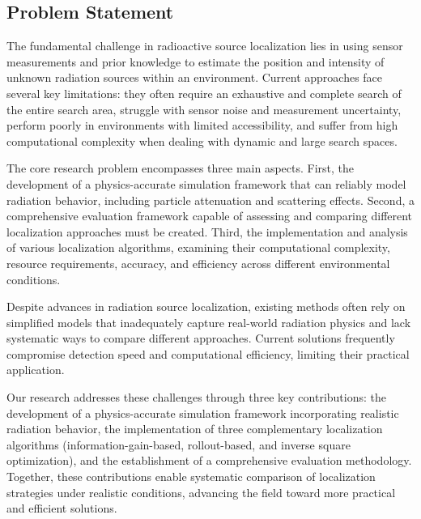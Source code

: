 \documentclass[../report.tex]{subfiles}
\begin{document}
    \subsection{Problem Statement}
    \label{sec:introduction:problem_statement}

    The fundamental challenge in radioactive source localization lies in using sensor measurements and prior knowledge to estimate the position and intensity of unknown radiation 
    sources within an environment. Current approaches face several key limitations: they often require an exhaustive and complete search of the entire search area, struggle with sensor noise and measurement 
    uncertainty, perform poorly in environments with limited accessibility, and suffer from high computational complexity when dealing with dynamic and large search spaces.
   
    The core research problem encompasses three main aspects. First, the development of a physics-accurate simulation framework that can reliably model radiation behavior, including particle 
    attenuation and scattering effects. Second, a comprehensive evaluation framework capable of assessing and comparing different localization approaches must be created. Third, the 
    implementation and analysis of various localization algorithms, examining their computational complexity, resource requirements, accuracy, and efficiency across different environmental conditions.
    \label{sec:introduction:proposed_approach}

    Despite advances in radiation source localization, existing methods often rely on simplified models that inadequately capture real-world radiation physics and 
    lack systematic ways to compare different approaches. Current solutions frequently compromise detection speed and computational efficiency, limiting their 
    practical application.
    
    
    Our research addresses these challenges through three key contributions: the development of a physics-accurate simulation framework incorporating realistic 
    radiation behavior, the implementation of three complementary localization algorithms (information-gain-based, rollout-based, and inverse square optimization), 
    and the establishment of a comprehensive evaluation methodology. Together, these contributions enable systematic comparison of localization strategies under 
    realistic conditions, advancing the field toward more practical and efficient solutions.
\end{document}
